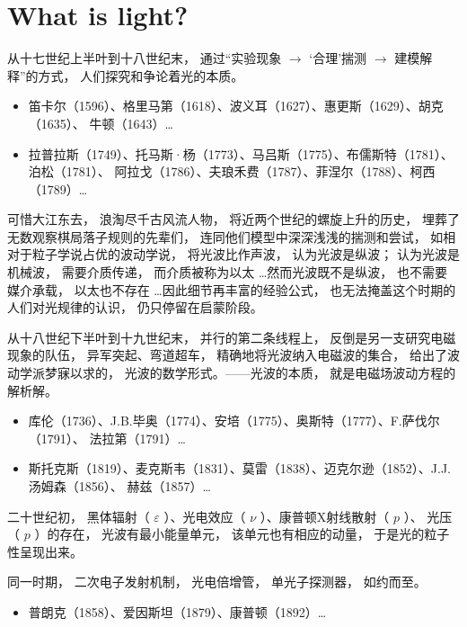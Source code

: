 \setchapterpreamble[u]{\margintoc}
\chapter{What is light?}

从十七世纪上半叶到十八世纪末， 通过“实验现象 $ \to $ ‘合理’揣测 $ \to $ 建模解释”的方式，
人们探究和争论着光的本质。

\begin{itemize}[noitemsep,leftmargin=20pt]
	\item 笛卡尔（1596）、格里马第（1618）、波义耳（1627）、惠更斯（1629）、胡克（1635）、
		  牛顿（1643）\ldots
	\item 拉普拉斯（1749）、托马斯·杨（1773）、马吕斯（1775）、布儒斯特（1781）、泊松（1781）、
		  阿拉戈（1786）、夫琅禾费（1787）、菲涅尔（1788）、柯西（1789）\ldots
\end{itemize}

可惜大江东去， 浪淘尽千古风流人物， 将近两个世纪的螺旋上升的历史， 埋葬了无数观察棋局落子规则的先辈们，
连同他们模型中深深浅浅的揣测和尝试， 如相对于粒子学说占优的波动学说， 将光波比作声波， 认为光波是纵波；
认为光波是机械波， 需要介质传递， 而介质被称为以太 \ldots 然而光波既不是纵波， 也不需要媒介承载，
以太也不存在 \ldots 因此细节再丰富的经验公式， 也无法掩盖这个时期的人们对光规律的认识，
仍只停留在启蒙阶段。

从十八世纪下半叶到十九世纪末， 并行的第二条线程上， 反倒是另一支研究电磁现象的队伍， 异军突起、弯道超车，
精确地将光波纳入电磁波的集合， 给出了波动学派梦寐以求的， 光波的数学形式。——光波的本质，
就是电磁场波动方程的解析解。

\begin{itemize}[noitemsep,leftmargin=20pt]
	\item 库伦（1736）、J.B.毕奥（1774）、安培（1775）、奥斯特（1777）、F.萨伐尔（1791）、
		  法拉第（1791）\ldots
	\item 斯托克斯（1819）、麦克斯韦（1831）、莫雷（1838）、迈克尔逊（1852）、J.J.汤姆森（1856）、
		  赫兹（1857）\ldots
\end{itemize}

二十世纪初， 黑体辐射（ $ \varepsilon $ ）、光电效应（ $ \nu $ ）、康普顿X射线散射（ $ p $ ）、
光压（ $ p $ ）的存在， 光波有最小能量单元， 该单元也有相应的动量， 于是光的粒子性呈现出来。

同一时期， 二次电子发射机制， 光电倍增管， 单光子探测器， 如约而至。

\begin{itemize}[noitemsep,leftmargin=20pt]
	\item 普朗克（1858）、爱因斯坦（1879）、康普顿（1892）\ldots
\end{itemize}

